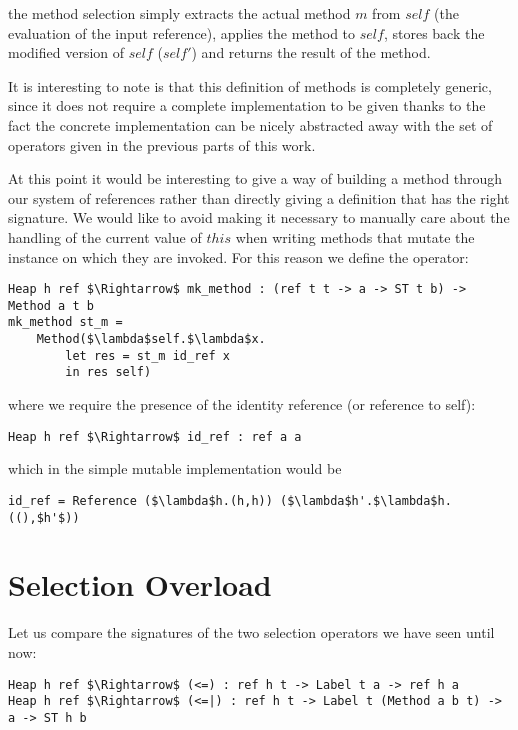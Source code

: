 \documentclass[a4paper]{article}
\begin{document}
the method selection simply extracts the actual method $m$ from $self$ (the evaluation of the input reference), applies the method to $self$, stores back the modified version of $self$ ($self'$) and returns the result of the method.

It is interesting to note is that this definition of methods is completely generic, since it does not require a complete implementation to be given thanks to the fact the concrete implementation can be nicely abstracted away with the set of operators given in the previous parts of this work.

At this point it would be interesting to give a way of building a method through our system of references rather than directly giving a definition that has the right signature. We would like to avoid making it necessary to manually care about the handling of the current value of $this$ when writing methods that mutate the instance on which they are invoked. For this reason we define the operator:

\begin{lstlisting}
Heap h ref $\Rightarrow$ mk_method : (ref t t -> a -> ST t b) -> Method a t b
mk_method st_m =
    Method($\lambda$self.$\lambda$x.
        let res = st_m id_ref x
        in res self)
\end{lstlisting}

where we require the presence of the identity reference (or reference to self):

\begin{lstlisting}
Heap h ref $\Rightarrow$ id_ref : ref a a
\end{lstlisting}

which in the simple mutable implementation would be

\begin{lstlisting}
id_ref = Reference ($\lambda$h.(h,h)) ($\lambda$h'.$\lambda$h.((),$h'$))
\end{lstlisting}

\section{Selection Overload}
Let us compare the signatures of the two selection operators we have seen until now:

\begin{lstlisting}
Heap h ref $\Rightarrow$ (<=) : ref h t -> Label t a -> ref h a
Heap h ref $\Rightarrow$ (<=|) : ref h t -> Label t (Method a b t) -> a -> ST h b
\end{lstlisting}
\end{document}
